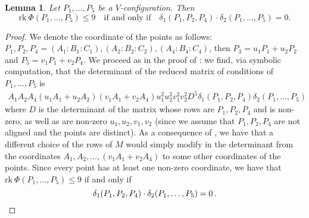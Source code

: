 \documentclass[11pt, a4paper, reqno, captions=tableheading,bibliography=totoc]{scrartcl}
\theoremstyle{plain}
\newtheorem{lemma}{Lemma}[section]
\theoremstyle{definition}
\newcommand{\rk}{\ensuremath{\mathrm{rk}}}
\begin{document}
\begin{lemma}
\label{lemma:d1d2}
Let $P_1, \dots, P_5$ be a $V$-configuration. Then
\[
\rk \ \Phi(P_1, \dots, P_5) \leq 9
\quad \mbox{
if and only if} \quad
\delta_1(P_1, P_2, P_4) \cdot \delta_2(P_1, \dots, P_5) = 0.
\]
\end{lemma}
\begin{proof}
We denote the coordinate of the points as follows:
$P_1, P_2, P_4 = (A_1: B_1: C_1), (A_2: B_2: C_2), (A_4: B_4: C_4)$,
then $P_3 = u_1P_1+u_2P_2$ and $P_5 = v_1P_1+v_2P_4$. We proceed as in
the proof of : we find, via symbolic computation, that the determinant of
the reduced matrix of conditions of $P_1, \dotsc, P_5$ is
%
\begin{gather}
\label{delta1delta2}
A_1A_2A_4(u_1A_1+u_2A_2)(v_1A_1+v_2A_4)u_1^2u_2^2v_1^2v_2^2D^5
\delta_1(P_1,P_2,P_4)\delta_2(P_1,\dots,P_5)
\end{gather}
%
where $D$ is the determinant of the matrix whose rows are $P_1, P_2, P_4$
and is non-zero, as well as are non-zero $u_1, u_2, v_1, v_2$ (since we
assume that $P_1, P_2, P_4$ are not aligned and the points are distinct).
As a consequence of , we have that a different
choice of the rows of $M$ would simply modify in the
determinant from  the coordinates
$A_1, A_2, \dots, (v_1A_1+v_2A_4)$ to some other coordinates of the points.
Since every point has at least one non-zero coordinate, we have that
$\rk \ \Phi(P_1, \dots, P_5) \leq 9$ if and only if
\[
\delta_1(P_1, P_2, P_4) \cdot \delta_2(P_1, \dots, P_5) = 0 \,. \qedhere
\]
\end{proof}
\end{document}
